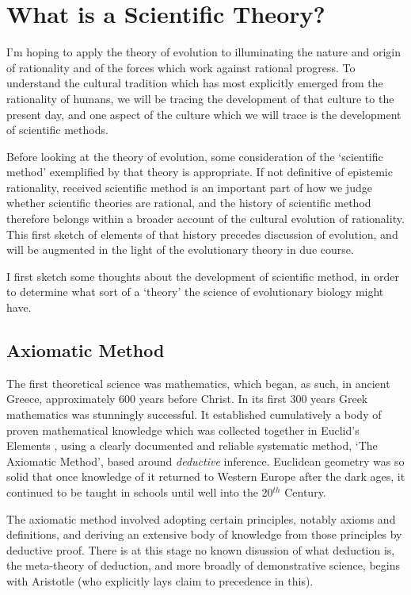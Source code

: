 \documentclass[10pt,titlepage]{article}
\begin{document}
\section{What is a Scientific Theory?}


I'm hoping to apply the theory of evolution to illuminating the nature and origin of rationality and of the forces which work against rational progress.
To understand the cultural tradition which has most explicitly emerged from the rationality of humans, we will be tracing the development of that culture to the present day, and one aspect of the culture which we will trace is the development of scientific methods.

Before looking at the theory of evolution, some consideration of the `scientific method' exemplified by that theory is appropriate.
If not definitive of epistemic rationality, received scientific method is an important part of how we judge whether scientific theories are rational, and the history of scientific method therefore belongs within a broader account of the cultural evolution of rationality.
This first sketch of elements of that history precedes discussion of evolution, and will be augmented in the light of the evolutionary theory in due course.

I first sketch some thoughts about the development of scientific method, in order to determine what sort of a `theory' the science of evolutionary biology might have.

\subsection{Axiomatic Method}

The first theoretical science was mathematics, which began, as such, in ancient Greece, approximately 600 years before Christ.
In its first 300 years Greek mathematics was stunningly successful.
It established cumulatively a body of proven mathematical knowledge which was collected together in Euclid's Elements \cite{euclidEL1}, using a clearly documented and reliable systematic method, `The Axiomatic Method', based around \emph{deductive} inference.
Euclidean geometry was so solid that once knowledge of it returned to Western Europe after the dark ages, it continued to be taught in schools until well into the 20$^{th}$ Century.

The axiomatic method involved adopting certain principles, notably axioms and definitions, and deriving an extensive body of knowledge from those principles by deductive proof.
There is at this stage no known disussion of what deduction is, the meta-theory of deduction, and more broadly of demonstrative science, begins with Aristotle (who explicitly lays claim to precedence in this).
\end{document}
